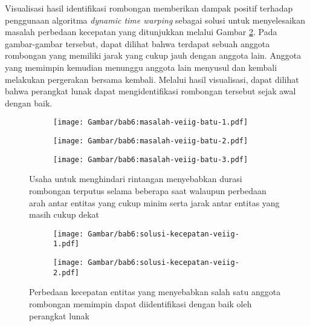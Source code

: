 Visualisasi hasil identifikasi rombongan memberikan dampak positif terhadap penggunaan algoritma \textit{dynamic time warping} sebagai solusi untuk menyelesaikan masalah perbedaan kecepatan yang ditunjukkan melalui Gambar \ref{bab6:solusi-beda-kecepatan-veiig}. Pada gambar-gambar tersebut, dapat dilihat bahwa terdapat sebuah anggota rombongan yang memiliki jarak yang cukup jauh dengan anggota lain. Anggota yang memimpin kemudian menunggu anggota lain menyusul dan kembali melakukan pergerakan bersama kembali. Melalui hasil visualisasi, dapat dilihat bahwa perangkat lunak dapat mengidentifikasi rombongan tersebut sejak awal dengan baik.

\begin{figure}[h]
    \centering
    \captionsetup{width=.8\textwidth}
    \begin{subfigure}[t]{0.25\textwidth}
        \centering
        \texttt{[image: Gambar/bab6:masalah-veiig-batu-1.pdf]}
    \end{subfigure}
    \begin{subfigure}[t]{0.275\textwidth}
        \centering
        \texttt{[image: Gambar/bab6:masalah-veiig-batu-2.pdf]}
    \end{subfigure}
    \begin{subfigure}[t]{0.25\textwidth}
        \centering
        \texttt{[image: Gambar/bab6:masalah-veiig-batu-3.pdf]}
    \end{subfigure}
    \caption[Masalah menghindari rintangan]{Usaha untuk menghindari rintangan menyebabkan durasi rombongan terputus selama beberapa saat walaupun perbedaan arah antar entitas yang cukup minim serta jarak antar entitas yang masih cukup dekat}
    \label{bab6:masalah-rintangan-veiig}
\end{figure}

\begin{figure}[t]
    \centering
    \captionsetup{width=.8\textwidth}
    \begin{subfigure}[b]{0.275\textwidth}
        \centering
        \texttt{[image: Gambar/bab6:solusi-kecepatan-veiig-1.pdf]}
    \end{subfigure}
    \begin{subfigure}[b]{0.275\textwidth}
        \centering
        \texttt{[image: Gambar/bab6:solusi-kecepatan-veiig-2.pdf]}
    \end{subfigure}
    \caption[Penyelesaian masalah beda kecepatan pada data VEIIG]{Perbedaan kecepatan entitas yang menyebabkan salah satu anggota rombongan memimpin dapat diidentifikasi dengan baik oleh perangkat lunak}
    \label{bab6:solusi-beda-kecepatan-veiig}
\end{figure}

